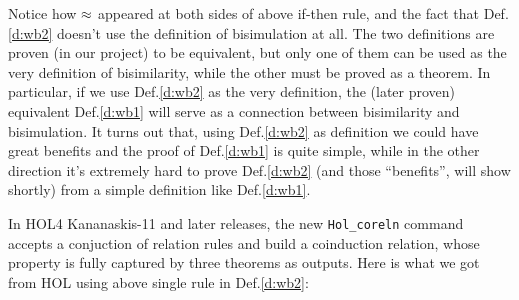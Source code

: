 Notice how $\approx$ appeared at both sides of above if-then rule, and the fact that Def.\;\ref{d:wb2} doesn't use the definition of bisimulation at all.  The two definitions are proven (in our project) to be equivalent, but only one of them can be used as the very definition of bisimilarity, while the other must be proved as a theorem.  In particular, if we use Def.\;\ref{d:wb2} as the very definition, the (later proven) equivalent Def.\;\ref{d:wb1} will serve as a connection between bisimilarity and bisimulation. It turns out that, using Def.\;\ref{d:wb2} as definition we could have great benefits and the proof of Def.\;\ref{d:wb1} is quite simple, while in the other direction it's extremely hard to prove Def.\;\ref{d:wb2} (and those ``benefits'', will show shortly) from a simple definition like Def.\;\ref{d:wb1}.

In HOL4 Kananaskis-11 and later releases, the new \texttt{Hol_coreln} command accepts a conjuction of relation rules and build a coinduction relation, whose property is fully captured by three theorems as outputs. Here is what we got from HOL using above single rule in Def.\;\ref{d:wb2}:
